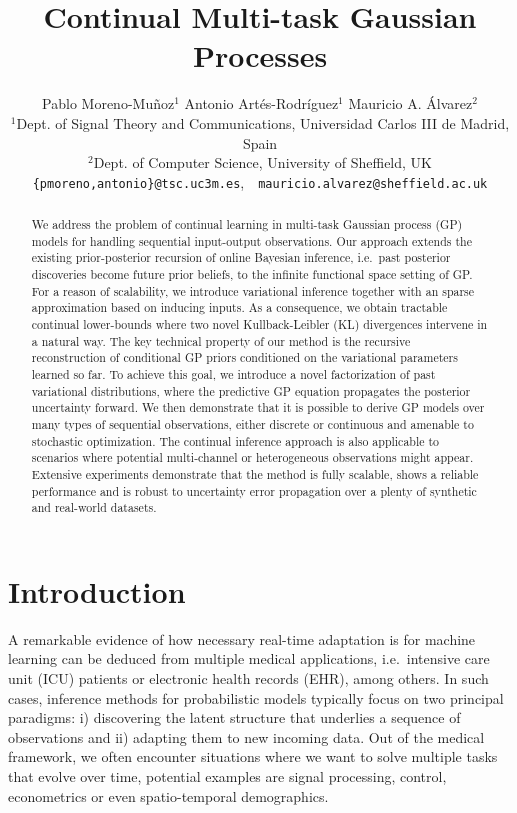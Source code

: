 \documentclass[]{article}
\title{Continual Multi-task Gaussian Processes}
\author{\hspace*{0.35cm}  Pablo Moreno-Mu\~noz$^{1}$ \hspace*{1.0cm} Antonio Art\'es-Rodr\'iguez$^{1}$ \hspace*{1.0cm} Mauricio A. \'Alvarez$^2$ \\
  	$^1$Dept. of Signal Theory and Communications, Universidad Carlos III de Madrid, Spain\\
  	$^2$Dept. of Computer Science, University of Sheffield, UK\\
  	\texttt{\{pmoreno,antonio\}@tsc.uc3m.es},~~\texttt{mauricio.alvarez@sheffield.ac.uk}\\
}
\begin{document}
\maketitle

\begin{abstract}We address the problem of continual learning in multi-task Gaussian process (GP) models for handling sequential input-output observations. Our approach extends the existing prior-posterior recursion of online Bayesian inference, i.e.\ past posterior discoveries become future prior beliefs, to the infinite functional space setting of GP. For a reason of scalability, we introduce variational inference together with an sparse approximation based on inducing inputs. 
As a consequence, we obtain tractable continual lower-bounds where two novel Kullback-Leibler (KL) divergences intervene in a natural way. 
The key technical property of our method is the recursive reconstruction of conditional GP priors conditioned on the variational parameters learned so far. To achieve this goal, we introduce a novel factorization of past variational distributions, where the predictive GP equation propagates the posterior uncertainty forward.
We then demonstrate that it is possible to derive GP models over many types of sequential observations, either discrete or continuous and amenable to stochastic optimization.
The continual inference approach is also applicable to scenarios where potential multi-channel or heterogeneous observations might appear. Extensive experiments demonstrate that the method is fully scalable, shows a reliable performance and is robust to uncertainty error propagation over a plenty of synthetic and real-world datasets.
\end{abstract}

\section{Introduction}
\label{introduction}

A remarkable evidence of how necessary real-time adaptation is for machine learning can be deduced from multiple medical applications, i.e.\ intensive care unit (ICU) patients or electronic health records (EHR), among others. In such cases, inference methods for probabilistic models typically focus on two principal paradigms: i) discovering the latent structure that underlies a sequence of observations and ii) adapting them to new incoming data.
Out of the medical framework, we often encounter situations where we want to solve multiple tasks that evolve over time, potential examples are signal processing, control, econometrics or even spatio-temporal demographics. 
\end{document}
